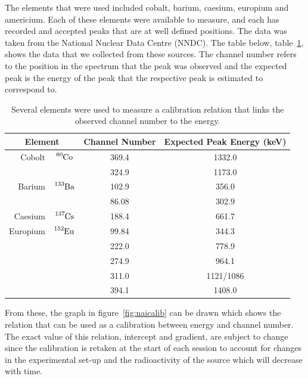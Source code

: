 The elements that were used included cobalt, barium, caesium, europium and americium. Each of these elements were available to measure, and each has recorded and accepted peaks that are at well defined positions. The data was taken from the National Nuclear Data Centre (NNDC)\cite{nndc}. The table below, table~\ref{tab:calibdata}, shows the data that we collected from these sources. The channel number refers to the position in the spectrum that the peak was observed and the expected peak is the energy of the peak that the respective peak is estimated to correspond to.

\begin{table}[ht]
	\centering
	\begin{tabular}{r c|c|c}
		\multicolumn{2}{c|}{Element} & Channel Number & Expected Peak Energy (keV) \\
		\hline\hline
		Cobolt 		& $\ce{^{60}Co}$  & 369.4	& 1332.0 \\
					&				  & 324.9	& 1173.0	\\
		\hline
		Barium		& $\ce{^{133}Ba}$ & 102.9	& 356.0	\\
					&				  & 86.08	& 302.9		\\
		\hline
		Caesium		& $\ce{^{137}Cs}$ & 188.4	& 661.7 \\
		\hline
		Europium	& $\ce{^{152}Eu}$ & 99.84	& 344.3 \\
					&				  & 222.0	& 778.9		\\
					&				  & 274.9	& 964.1		\\
					&				  & 311.0	& 1121/1086	\\
					&				  & 394.1	& 1408.0	
	\end{tabular}
	\caption{Several elements were used to measure a calibration relation that links the observed channel number to the energy.\label{tab:calibdata}}
\end{table}
From these, the graph in figure~\ref{fig:naicalib} can be drawn which shows the relation that can be used as a calibration between energy and channel number. The exact value of this relation, intercept and gradient, are subject to change since the calibration is retaken at the start of each session to account for changes in the experimental set-up and the radioactivity of the source which will decrease with time.

